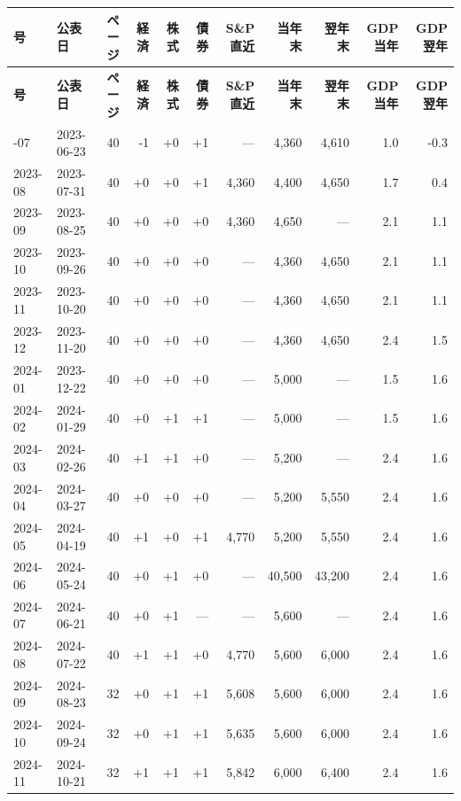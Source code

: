 \documentclass[xelatex,ja=standard,jafont=hiragino-pron,a4paper,10pt]{bxjsreport}
\begin{document}
{\scriptsize
\begin{longtable}{llrrrrrrrrr}
\toprule
\textbf{号} & \textbf{公表日} & \textbf{ページ} & \textbf{経済} & \textbf{株式} & \textbf{債券} & \textbf{S\&P 直近} & \textbf{当年末} & \textbf{翌年末} & \textbf{GDP 当年} & \textbf{GDP 翌年} \\
\midrule
\endfirsthead
\toprule
\textbf{号} & \textbf{公表日} & \textbf{ページ} & \textbf{経済} & \textbf{株式} & \textbf{債券} & \textbf{S\&P 直近} & \textbf{当年末} & \textbf{翌年末} & \textbf{GDP 当年} & \textbf{GDP 翌年} \\
\midrule
\endhead
\bottomrule
\endfoot
2023-07 & 2023-06-23 & 40 & -1 & +0 & +1 & --- & 4,360 & 4,610 & 1.0 & -0.3 \\
2023-08 & 2023-07-31 & 40 & +0 & +0 & +1 & 4,360 & 4,400 & 4,650 & 1.7 & 0.4 \\
2023-09 & 2023-08-25 & 40 & +0 & +0 & +0 & 4,360 & 4,650 & --- & 2.1 & 1.1 \\
2023-10 & 2023-09-26 & 40 & +0 & +0 & +0 & --- & 4,360 & 4,650 & 2.1 & 1.1 \\
2023-11 & 2023-10-20 & 40 & +0 & +0 & +0 & --- & 4,360 & 4,650 & 2.1 & 1.1 \\
2023-12 & 2023-11-20 & 40 & +0 & +0 & +0 & --- & 4,360 & 4,650 & 2.4 & 1.5 \\
2024-01 & 2023-12-22 & 40 & +0 & +0 & +0 & --- & 5,000 & --- & 1.5 & 1.6 \\
2024-02 & 2024-01-29 & 40 & +0 & +1 & +1 & --- & 5,000 & --- & 1.5 & 1.6 \\
2024-03 & 2024-02-26 & 40 & +1 & +1 & +0 & --- & 5,200 & --- & 2.4 & 1.6 \\
2024-04 & 2024-03-27 & 40 & +0 & +0 & +0 & --- & 5,200 & 5,550 & 2.4 & 1.6 \\
2024-05 & 2024-04-19 & 40 & +1 & +0 & +1 & 4,770 & 5,200 & 5,550 & 2.4 & 1.6 \\
2024-06 & 2024-05-24 & 40 & +0 & +1 & +0 & --- & 40,500 & 43,200 & 2.4 & 1.6 \\
2024-07 & 2024-06-21 & 40 & +0 & +1 & --- & --- & 5,600 & --- & 2.4 & 1.6 \\
2024-08 & 2024-07-22 & 40 & +1 & +1 & +0 & 4,770 & 5,600 & 6,000 & 2.4 & 1.6 \\
2024-09 & 2024-08-23 & 32 & +0 & +1 & +1 & 5,608 & 5,600 & 6,000 & 2.4 & 1.6 \\
2024-10 & 2024-09-24 & 32 & +0 & +1 & +1 & 5,635 & 5,600 & 6,000 & 2.4 & 1.6 \\
2024-11 & 2024-10-21 & 32 & +1 & +1 & +1 & 5,842 & 6,000 & 6,400 & 2.4 & 1.6 \\

\end{longtable}}
\end{document}
